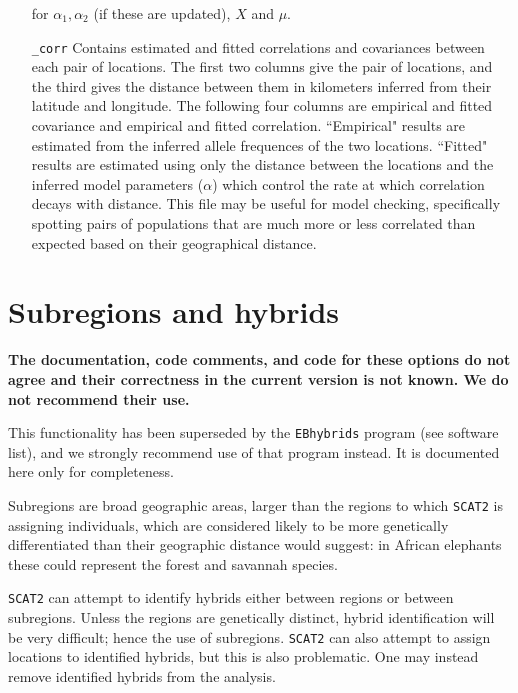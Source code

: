 \documentclass[10pt,titlepage,times,letterpaper]{article}
\def\SCAT{{\tt SCAT2} }
\begin{document}
\begin{enumerate}[\_params]
for $\alpha_1,\alpha_2$ (if these are updated), $X$ and $\mu$.
\item[{\tt \_corr}] Contains estimated and fitted correlations
and covariances between each pair of locations.  The first two columns
give the pair of locations, and the third gives the distance between them
in kilometers inferred from their latitude and longitude.  The following
four columns are empirical and fitted covariance and empirical and
fitted correlation.  ``Empirical" results are estimated from the inferred
allele frequences of the two locations.  ``Fitted" results are estimated
using only the distance between the locations and the inferred model
parameters ($\alpha$) which control the rate at which correlation decays
with distance.  This file may be useful for model checking, specifically
spotting pairs of populations that are much more or less correlated than
expected based on their geographical distance.
\end{enumerate}







\section{Subregions and hybrids}

{\bf The documentation, code comments, and code for these options do
not agree and their correctness in the current version is not known.
We do not recommend their use.}

This functionality has been superseded by the {\tt EBhybrids}
program (see software list), and we strongly recommend use of that 
program instead.  It is documented here only for completeness. 

Subregions are broad geographic areas, larger than the regions to which
\SCAT is assigning individuals, which are considered likely to be
more genetically differentiated than their geographic distance would
suggest:  in African elephants these could represent the forest and
savannah species.  

\SCAT can attempt to identify hybrids either between regions or
between subregions.  Unless the regions are genetically
distinct, hybrid identification will be very difficult; hence the
use of subregions.  \SCAT can also attempt to assign locations to
identified hybrids, but this is also problematic.  One may instead
remove identified hybrids from the analysis.
\end{document}
